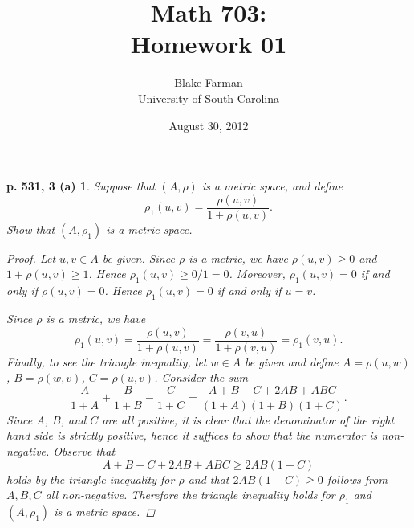\documentclass[10pt]{amsart}
\author{Blake Farman\\University of South Carolina}
\title{Math 703:\\Homework 01}
\date{August 30, 2012}
\begin{document}
\maketitle

\providecommand{\norm}[1]{\lVert#1\rVert}
\renewcommand{\qedsymbol}{\ensuremath{\blacksquare}}
\newcommand{\abs}[1]{\left| #1 \right|}

\newtheorem*{ex3a}{p. 531, 3 (a)}
\newtheorem*{ex4}{p. 531, 4}
\newtheorem*{ex13}{p. 532, 13}
\newtheorem*{ex25}{p. 535, 25}

\begin{ex3a}
  Suppose that $(A,\rho)$ is a metric space, and define 
  $$\rho_1(u,v) = \frac{\rho(u,v)}{1 + \rho(u,v)}.$$
  Show that $(A, \rho_1)$ is a metric space.
  
  \begin{proof}
    Let $u,v \in A$ be given.
    Since $\rho$ is a metric, we have $\rho(u,v) \geq 0$ and $1 + \rho(u,v) \geq 1$.
    Hence $\rho_1(u,v) \geq 0 / 1 = 0$.
    Moreover, $\rho_1(u,v) = 0$ if and only if $\rho(u,v) = 0$.  
	Hence $\rho_1(u,v) = 0$ if and only if $u = v$.
    
    Since $\rho$ is a metric, we have
    $$\rho_1(u,v) = \frac{\rho(u,v)}{1 + \rho(u,v)} = \frac{\rho(v,u)}{1 + \rho(v,u)} = \rho_1(v,u).$$
    Finally, to see the triangle inequality, let $w \in A$ be given and define $A = \rho(u,w)$, $B = \rho(w,v)$, $C = \rho(u,v)$.
    Consider the sum
    $$ \frac{A}{1+A} + \frac{B}{1 + B} - \frac{C}{1+C} = \frac{A + B - C + 2AB + ABC}{(1+A)(1+B)(1+C)}.$$
    Since $A$, $B$, and $C$ are all positive, it is clear that the denominator of the right hand side is strictly positive, hence it suffices to show that the numerator is non-negative.
    Observe that $$A + B - C + 2AB + ABC \geq 2AB(1 + C)$$ holds by the triangle inequality for $\rho$ and that $2AB(1+C) \geq 0$ follows from $A,B,C$ all non-negative.
    Therefore the triangle inequality holds for $\rho_1$ and $(A,\rho_1)$ is a metric space.
  \end{proof}
\end{ex3a}
\end{document}
